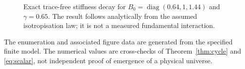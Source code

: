 \documentclass[11pt,a4paper]{article}
\numberwithin{equation}{section}
\newcommand{\1}{\mathbf{1}}
\begin{document}
\begin{figure}[H]
 \centering
 \caption{Exact trace-free stiffness decay for $B_0=\operatorname{diag}(0.64,1,1.44)$ and $\gamma=0.65$. The result follows analytically from the assumed isotropisation law; it is not a measured fundamental interaction.}\label{fig:relaxation}
\end{figure}
The enumeration and associated figure data are generated from the specified finite model. The numerical values are cross-checks of Theorem~\ref{thm:cycle} and \eqref{eq:scalar}, not independent proof of emergence of a physical universe.
\end{document}
